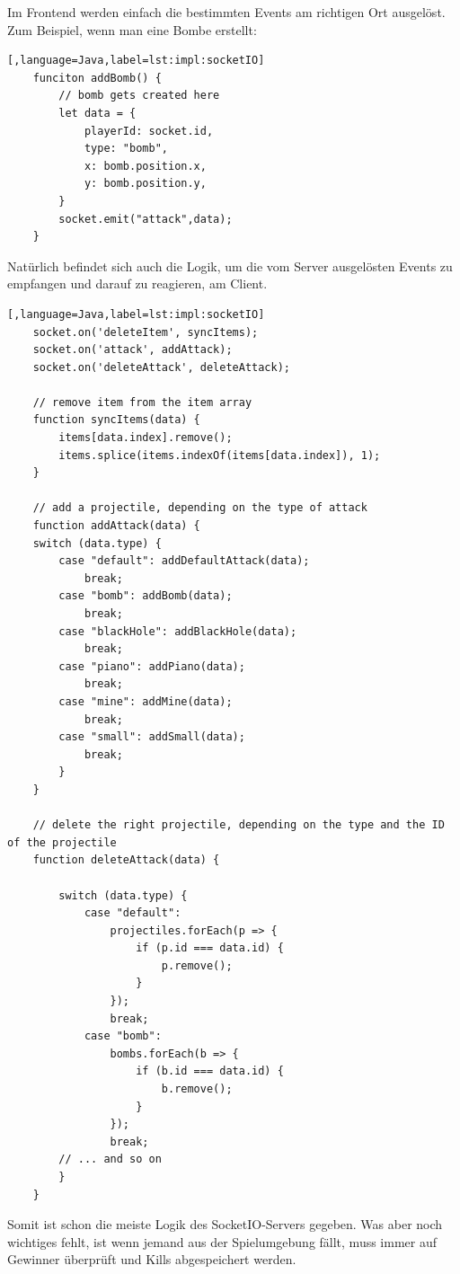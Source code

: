  Im Frontend werden einfach die bestimmten Events am richtigen Ort ausgelöst. 
 Zum Beispiel, wenn man eine Bombe erstellt: 

 \begin{lstlisting}[,language=Java,label=lst:impl:socketIO]
    funciton addBomb() {
        // bomb gets created here
        let data = {
            playerId: socket.id,
            type: "bomb",
            x: bomb.position.x,
            y: bomb.position.y,
        }   
        socket.emit("attack",data);
    }
 \end{lstlisting}


 Natürlich befindet sich auch die Logik, um die vom Server ausgelösten Events zu empfangen und darauf zu reagieren, am Client.

 \begin{lstlisting}[,language=Java,label=lst:impl:socketIO]
    socket.on('deleteItem', syncItems);
    socket.on('attack', addAttack);
    socket.on('deleteAttack', deleteAttack);

    // remove item from the item array
    function syncItems(data) {
        items[data.index].remove();
        items.splice(items.indexOf(items[data.index]), 1);
    }

    // add a projectile, depending on the type of attack
    function addAttack(data) {
    switch (data.type) {
        case "default": addDefaultAttack(data);
            break;
        case "bomb": addBomb(data);
            break;
        case "blackHole": addBlackHole(data);
            break;
        case "piano": addPiano(data);
            break;
        case "mine": addMine(data);
            break;
        case "small": addSmall(data);
            break;
        }  
    }

    // delete the right projectile, depending on the type and the ID of the projectile
    function deleteAttack(data) {
        
        switch (data.type) {
            case "default":
                projectiles.forEach(p => {
                    if (p.id === data.id) {
                        p.remove();
                    }
                });
                break;
            case "bomb":
                bombs.forEach(b => {
                    if (b.id === data.id) {
                        b.remove();
                    }
                });
                break;
        // ... and so on
        }
    }

 \end{lstlisting}

 Somit ist schon die meiste Logik des SocketIO-Servers gegeben. Was aber noch wichtiges fehlt, ist wenn jemand aus der Spielumgebung fällt, muss immer auf Gewinner überprüft und Kills abgespeichert werden.

